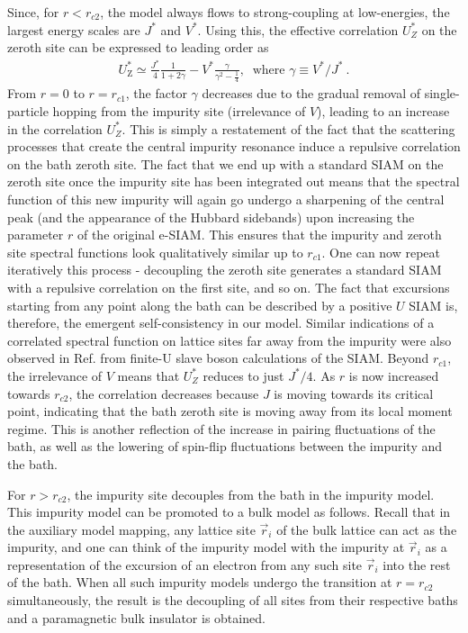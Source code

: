 \documentclass{iopart}
\begin{document}
Since, for \(r < r_{c2}\), the model always flows to strong-coupling at low-energies, the largest energy scales are \(J^*\) and \(V^*\). Using this, the effective correlation \(U_Z^*\) on the zeroth site can be expressed to leading order as
\begin{eqnarray}
	\label{new-imp-correlation}
	U_\text{Z}^* \simeq \frac{J^*}{4}\frac{1}{1 + 2\gamma} - V^* \frac{\gamma}{\gamma^2 - \frac{1}{4}},~ \text{ where }\gamma\equiv V^*/J^*~.
\end{eqnarray}
From \(r = 0\) to \(r = r_{c1}\), the factor \(\gamma\) decreases due to the gradual removal of single-particle hopping from the impurity site (irrelevance of \(V\)), leading to an increase in the correlation \(U_Z^*\). This is simply a restatement of the fact that the scattering processes that create the central impurity resonance induce a repulsive correlation on the bath zeroth site. The fact that we end up with a standard SIAM on the zeroth site once the impurity site has been integrated out means that the spectral function of this new impurity will again go undergo a sharpening of the central peak (and the appearance of the Hubbard sidebands) upon increasing the parameter $r$ of the original e-SIAM. This ensures that the impurity and zeroth site spectral functions look qualitatively similar up to \(r_{c1}\). One can now repeat iteratively this process - decoupling the zeroth site generates a standard SIAM with a repulsive correlation on the first site, and so on. The fact that excursions starting from any point along the bath can be described by a positive \(U\) SIAM is, therefore, the emergent self-consistency in our model. Similar indications of a correlated spectral function on lattice sites far away from the impurity were also observed in Ref.\cite{martin2019} from finite-U slave boson calculations of the SIAM. Beyond \(r_{c1}\), the irrelevance of \(V\) means that \(U_Z^*\) reduces to just \(J^*/4\). As \(r\) is now increased towards \(r_{c2}\), the correlation decreases because \(J\) is moving towards its critical point, indicating that the bath zeroth site is moving away from its local moment regime. This is another reflection of the increase in pairing fluctuations of the bath, as well as the lowering of spin-flip fluctuations between the impurity and the bath.

For \(r > r_{c2}\), the impurity site decouples from the bath in the impurity model. This impurity model can be promoted to a bulk model as follows. Recall that in the auxiliary model mapping, any lattice site \(\vec r_i\) of the bulk lattice can act as the impurity, and one can think of the impurity model with the impurity at \(\vec r_i\) as a representation of the excursion of an electron from any such site \(\vec r_i\) into the rest of the bath. When all such impurity models undergo the transition at \(r = r_{c2}\) simultaneously, the result is the decoupling of all sites from their respective baths and a paramagnetic bulk insulator is obtained.
\end{document}
